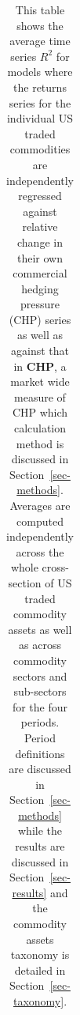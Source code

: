 \documentclass[
  authoryear,
  preprint,
  3p]{elsarticle}
\begin{document}
\begin{longtable}[t]{>{}l>{}l>{}l>{}r>{}r>{}r>{}r}

\caption{\label{tbl-time-reg-US-CHP}This table shows the average time
series \(R^{2}\) for models where the returns series for the individual
US traded commodities are independently regressed against relative
change in their own commercial hedging pressure (CHP) series as well as
against that in \textbf{CHP}, a market wide measure of CHP which
calculation method is discussed in Section~\ref{sec-methods}. Averages
are computed independently across the whole cross-section of US traded
commodity assets as well as across commodity sectors and sub-sectors for
the four periods. Period definitions are discussed in
Section~\ref{sec-methods} while the results are discussed in
Section~\ref{sec-results} and the commodity assets taxonomy is detailed
in Section~\ref{sec-taxonomy}.}

\tabularnewline


\end{longtable}
\end{document}
